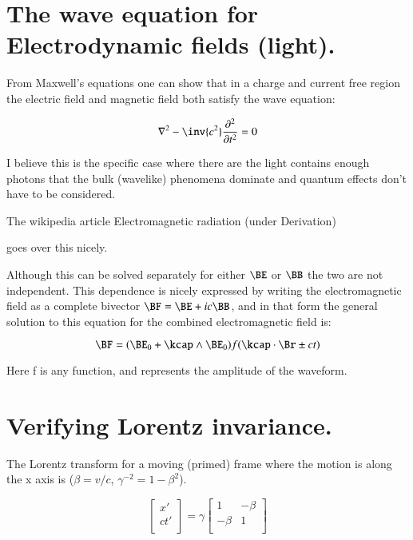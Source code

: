 \section{The wave equation for Electrodynamic fields (light).}

From Maxwell's equations one can show that in a charge and current free region
the electric field and magnetic field both satisfy the wave equation:

\begin{equation}
\laplacian - \inv{c^2}\frac{\partial^2}{\partial t^2} = 0
\end{equation}

I believe this is the specific case where there are the light contains enough
photons that the bulk (wavelike) phenomena dominate and quantum effects don't have to be considered.

The wikipedia article Electromagnetic radiation (under Derivation)


goes over this nicely.

Although this can be solved separately for either $\BE$ or $\BB$ the two are not independent.
This dependence is nicely expressed by writing the electromagnetic field as a complete
bivector $\BF = \BE + i c \BB$, and in that form the
general solution to this equation for the combined electromagnetic
field is:

\begin{equation}
\BF = (\BE_0 + \kcap \wedge \BE_0) f( \kcap \cdot \Br \pm c t)
\end{equation}

Here f is any function, and represents the amplitude of the waveform.

\section{Verifying Lorentz invariance.}

The Lorentz transform for a moving (primed) frame where the motion is
along the x axis is ($\beta = v/c$, $\gamma^{-2} = 1 -\beta^2$).

\begin{equation*}
\begin{bmatrix}
x' \\
c t' \\
\end{bmatrix}
=
\gamma
\begin{bmatrix}
1 & -\beta \\
-\beta & 1 \\
\end{bmatrix}
\end{equation*}

